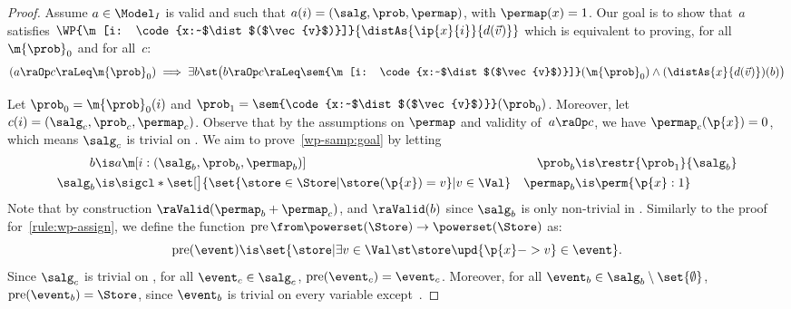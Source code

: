 \documentclass[acmsmall,nonacm,screen,appendix]{acmart}
\begin{document}
\begin{proof}
  \newcommand{\specialevent}{A}
  Assume $a \in \Model_I$ is valid and such that
  $ a(i) = (\salg, \prob, \permap)$, with $\permap(x) = 1$.
  Our goal is to show that~$a$ satisfies
  $
    \WP {\m[i: \code{x:~$\dist$($\vec{v}$)}]} {\distAs{\ip{x}{i}}{d(\vec{v})}}
  $
which is equivalent to proving, for all $\m{\prob}_0$ and for all~$c$:
\begin{equation}
    (a\raOp c \raLeq  \m{\prob}_0)
    \implies
      \exists b\st \bigl(
        b\raOp c \raLeq \sem{\m[i: \code{x:~$\dist$($\vec{v}$)}]}(\m{\prob}_0)
        \land
        (\distAs{x}{d(\vec{v})})(b)
      \bigr)
    \label{wp-samp:goal}
  \end{equation}

  Let $\prob_0 = \m{\prob}_0(i)$ and
      $\prob_1 = \sem{\code{x:~$\dist$($\vec{v}$)}}(\prob_0)$.
  Moreover, let $ c(i) = (\salg_c,\prob_c,\permap_c) $.
  Observe that by the assumptions on $\permap$ and validity of~$a \raOp c$,
  we have $\permap_c(\p{x})=0$,
  which means $\salg_c$ is trivial on .
  We aim to prove~\eqref{wp-samp:goal} by letting
  \begin{align*}
    b &\is a\m[i: {(\salg_b, \prob_b, \permap_b)}]
    &
    \prob_b &\is
      \restr{\prob_1}{\salg_b}
    \\
    \salg_b &\is
      \sigcl*{
        \set[\big]{
          \set{ \store \in \Store | \store(\p{x}) = v }
        | v\in \Val
        }
      }
    &
    \permap_b &\is
      \perm{\p{x}: 1}
\end{align*}
  Note that by construction $ \raValid(\permap_b + \permap_c) $,
  and $\raValid(b)$ since $\salg_b$ is only non-trivial in .
  \newcommand{\Pre}{\operatorname{pre}}
  Similarly to the proof for~\cref{rule:wp-assign},
  we define the function
  $
    \Pre \from \powerset(\Store) \to \powerset(\Store)
  $
  as:
  \[
    \Pre(\event) \is
      \set{ \store
          | \exists v \in \Val \st \store\upd{\p{x}->v} \in \event
        }.
  \]
  Since $\salg_c$ is trivial on ,
  for all $ \event_c \in \salg_c $,
  $\Pre(\event_c) = \event_c$.
  Moreover,
  for all $ \event_b \in \salg_b \setminus \set{\emptyset} $,
  $ \Pre(\event_b) = \Store $,
  since $\event_b$ is trivial on every variable except~.


\end{proof}
\end{document}
